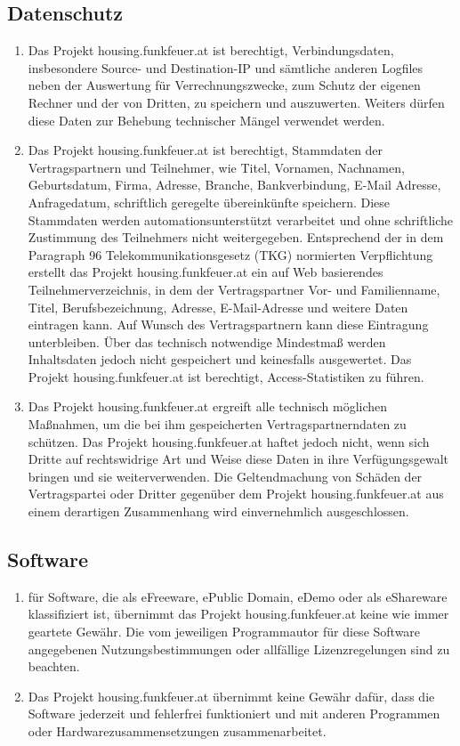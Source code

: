 \documentclass[parskip=half]{article}
\begin{document}
\subsection{ Datenschutz}
\begin{enumerate}
\item Das Projekt housing.funkfeuer.at ist berechtigt, Verbindungsdaten, insbesondere Source-
und Destination-IP und sämtliche anderen Logfiles neben der Auswertung für
Verrechnungszwecke, zum Schutz der eigenen Rechner und der von Dritten, zu speichern
und auszuwerten. Weiters dürfen diese Daten zur Behebung technischer Mängel
verwendet werden.
\item Das Projekt housing.funkfeuer.at ist berechtigt, Stammdaten der Vertragspartnern und
Teilnehmer, wie Titel, Vornamen, Nachnamen, Geburtsdatum, Firma, Adresse, Branche,
Bankverbindung, E-Mail Adresse, Anfragedatum, schriftlich geregelte übereinkünfte
speichern. Diese Stammdaten werden automationsunterstützt verarbeitet und ohne
schriftliche Zustimmung des Teilnehmers nicht weitergegeben. Entsprechend der in dem
Paragraph 96 Telekommunikationsgesetz (TKG) normierten Verpflichtung erstellt das
Projekt housing.funkfeuer.at ein auf Web basierendes Teilnehmerverzeichnis, in dem der
Vertragspartner Vor- und Familienname, Titel, Berufsbezeichnung, Adresse, E-Mail-Adresse
und weitere Daten eintragen kann. Auf Wunsch des Vertragspartnern kann diese
Eintragung unterbleiben. Über das technisch notwendige Mindestmaß werden
Inhaltsdaten jedoch nicht gespeichert und keinesfalls ausgewertet. Das Projekt
housing.funkfeuer.at ist berechtigt, Access-Statistiken zu führen.
\item Das Projekt housing.funkfeuer.at ergreift alle technisch möglichen Maßnahmen, um die
bei ihm gespeicherten Vertragspartnerndaten zu schützen. Das Projekt
housing.funkfeuer.at haftet jedoch nicht, wenn sich Dritte auf rechtswidrige Art und Weise
diese Daten in ihre Verfügungsgewalt bringen und sie weiterverwenden. Die
Geltendmachung von Schäden der Vertragspartei oder Dritter gegenüber dem Projekt
housing.funkfeuer.at aus einem derartigen Zusammenhang wird einvernehmlich
ausgeschlossen.
\end{enumerate}

\subsection{Software}
\begin{enumerate}
\item für Software, die als eFreeware, ePublic Domain, eDemo oder als eShareware
klassifiziert ist, übernimmt das Projekt housing.funkfeuer.at keine wie immer geartete
Gewähr. Die vom jeweiligen Programmautor für diese Software angegebenen
Nutzungsbestimmungen oder allfällige Lizenzregelungen sind zu beachten.
\item Das Projekt housing.funkfeuer.at übernimmt keine Gewähr dafür, dass die Software
jederzeit und fehlerfrei funktioniert und mit anderen Programmen oder
Hardwarezusammensetzungen zusammenarbeitet.
\end{enumerate}
\end{document}

